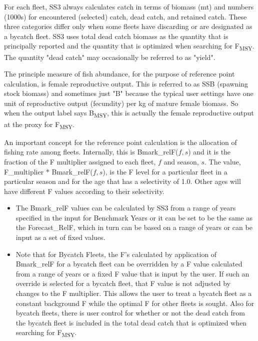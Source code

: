 \pagebreak
{}
For each fleet, SS3 always calculates catch in terms of biomass (mt) and numbers (1000s) for encountered (selected) catch, dead catch, and retained catch.  These three categories differ only when some fleets have discarding or are designated as a bycatch fleet.  SS3 uses total dead catch biomass as the quantity that is principally reported and the quantity that is optimized when searching for F\textsubscript{MSY}.  The quantity "dead catch" may occasionally be referred to as "yield".

The principle measure of fish abundance, for the purpose of reference point calculation, is female reproductive output.  This is referred to as SSB (spawning stock biomass) and sometimes just "B" because the typical user settings have one unit of reproductive output (fecundity) per kg of mature female biomass.  So when the output label says B\textsubscript{MSY}, this is actually the female reproductive output at the proxy for F\textsubscript{MSY}.

An important concept for the reference point calculation is the allocation of fishing rate among fleets.  Internally, this is Bmark\_relF($f,s$) and it is the fraction of the F multiplier assigned to each fleet, $f$ and season, $s$.  The value, F\_multiplier * Bmark\_relF($f,s$), is the F level for a particular fleet in a particular season and for the age that has a selectivity of 1.0.  Other ages will have different F values according to their selectivity.

\begin{itemize}
	\item The Bmark\_relF values can be calculated by SS3 from a range of years specified in the input for Benchmark Years or it can be set to be the same as the Forecast\_RelF, which in turn can be based on a range of years or can be input as a set of fixed values.
	
	\item Note that for Bycatch Fleets, the F's calculated by application of Bmark\_relF for a bycatch fleet can be overridden by a F value calculated from a range of years or a fixed F value that is input by the user.  If such an override is selected for a bycatch fleet, that F value is not adjusted by changes to the F multiplier.  This allows the user to treat a bycatch fleet as a constant background F while the optimal F for other fleets is sought.  Also for bycatch fleets, there is user control for whether or not the dead catch from the bycatch fleet is included in the total dead catch that is optimized when searching for F\textsubscript{MSY}.
\end{itemize}

